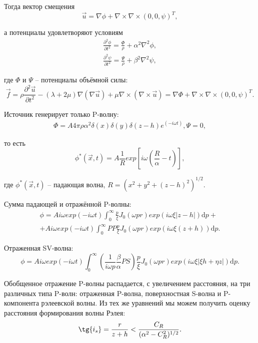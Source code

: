 Тогда вектор смещения
\begin{equation}
\vec{u} = \nabla \phi + \nabla \times \nabla \times (0, 0, \psi)^T,
\end{equation}

а потенциалы удовлетворяют условиям
\begin{eqnarray}
\frac{\partial^2 \phi}{\partial t^2} = \frac{\Phi}{\rho} + \alpha^2 \nabla^2 \phi, \nonumber\\
\frac{\partial^2 \psi}{\partial t^2} = \frac{\Psi}{\rho} + \beta^2 \nabla^2 \psi,
\end{eqnarray}

где $\Phi$ и $\Psi$ -- потенциалы объёмной силы:
\begin{equation}
\vec{f} = \rho \frac{\partial^2 \vec{u}}{\partial t^2} - (\lambda + 2\mu)\nabla(\nabla\vec{u}) + \mu \nabla \times (\nabla \times \vec{u} ) = \nabla \Phi + \nabla \times \nabla \times (0, 0, \psi)^T.
\end{equation}

Источник генерирует только P-волну:
\begin{eqnarray}
\Phi = A 4\pi \rho \alpha^2 \delta(x)\delta(y)\delta(z-h)e^(-i \omega t),
\Psi = 0,
\end{eqnarray}

то есть
\begin{equation}
\phi^*(\vec{x}, t) = A \frac{1}{R} exp[i\omega (\frac{R}{\alpha} - t)],
\end{equation}

где $\phi^*(\vec{x}, t)$ -- падающая волна, $R = (x^2 + y^2 + (z-h)^2)^{1/2}$.

Сумма падающей и отражённой P-волны:
\begin{eqnarray}
\phi = A i \omega exp(-i \omega t) \int_0^\infty { \frac{p}{\xi}J_0(\omega pr)exp(i \omega \xi |z - h|) \mathrm{d}p} + \nonumber\\
	+ A i \omega exp(-i \omega t) \int_0^\infty { PP \frac{p}{\xi}J_0(\omega pr)exp(i \omega \xi (z + h)) \mathrm{d}p}.
\end{eqnarray}

Отраженная SV-волна:
\begin{equation}
\phi = A i \omega exp(-i \omega t) \int_0^\infty { (\frac{1}{i \omega p} \frac{\beta}{\alpha} PS) \frac{p}{\xi}J_0(\omega pr)exp(i \omega \xi |\xi h + \eta z|) \mathrm{d}p}.
\end{equation}

Обобщенное отражение P-волны распадается, с увеличением расстояния, на три различных типа P-волн: отраженная P-волна, поверхностная S-волна и P-компонента рэлеевской волны. Из тех же уравнений мы можем получить оценку расстояния формирования волны Рэлея:
\begin{equation}
\tg{i_s} = \frac{r}{z+h} < \frac{C_R}{(\alpha^2 - C_R^2)^{1/2}}.
\end{equation}

